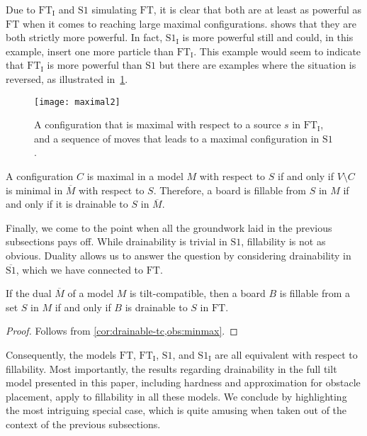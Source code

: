 \documentclass[a4paper,UKenglish,cleveref,thm-restate]{lipics-v2021}
\newcommand{\FT}{\ensuremath{\mathrm{FT}}\xspace}
\newcommand{\SSt}{\ensuremath{\mathrm{S1}}\xspace}
\newcommand{\IE}[1][\FT]{\ensuremath{{#1}_\mathrm{I}}\xspace}
\newcommand{\dual}[1]{\ensuremath{\overline{#1}}\xspace}
\begin{document}
Due to \IE and \SSt simulating \FT, it is clear that both are at least as
powerful as \FT when it comes to reaching large maximal
configurations.  shows that they are both strictly more
powerful. In fact, \IE[\SSt] is more powerful still and could, in this example,
insert one more particle than \IE. This example would seem to indicate that \IE
is more powerful than \SSt but there are examples where the situation is
reversed, as illustrated in~\cref{fig:maximal2}.

\begin{figure}[htb]
	\centering
	\texttt{[image: maximal2]}\caption{A configuration that is maximal with respect to a source $s$ in \IE,
		and a sequence of moves that leads to a maximal configuration in
		\SSt.}\label{fig:maximal2}
\end{figure}

\begin{observation}\label{obs:minmax}
A configuration $C$ is maximal in a model $M$ with respect to $S$ if and only if
$V \setminus C$ is minimal in $\dual{M}$ with respect to $S$. Therefore, a
board is fillable from $S$ in $M$ if and only if it is drainable to $S$ in
$\dual{M}$.
\end{observation}

Finally, we come to the point when all the groundwork laid in the previous
subsections pays off. While drainability is trivial in \SSt,
fillability is not as obvious. Duality allows us to answer the question by
considering drainability in $\dual{\SSt}$, which we have connected to \FT.

\begin{theorem}\label{thm:tc-fill}
If the dual $\dual{M}$ of a model $M$ is tilt-compatible, then a board $B$ is
fillable from a set $S$ in $M$ if and only if $B$ is drainable to $S$ in \FT.
\end{theorem}
\begin{proof}
Follows from \cref{cor:drainable-tc,obs:minmax}.
\end{proof}

Consequently, the models \FT, \IE, \SSt, and \IE[\SSt] are all
equivalent with respect to fillability. Most importantly, the results regarding
drainability in the full tilt model presented in this paper, including hardness
and approximation for obstacle placement, apply to fillability in all these
models. We conclude by highlighting the most intriguing special case, which is
quite amusing when taken out of the context of the previous subsections.
\end{document}
